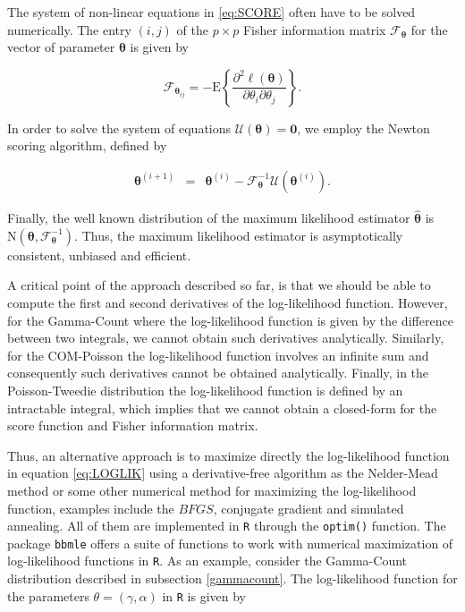 \documentclass[9pt,a5paper,]{book}
\theoremstyle{definition}
\theoremstyle{definition}
\theoremstyle{remark}
\begin{document}
The system of non-linear equations in \eqref{eq:SCORE} often have to be
solved numerically. The entry \((i,j)\) of the \(p \times p\) Fisher
information matrix \(\mathcal{F}_{\boldsymbol{\theta}}\) for the vector
of parameter \(\boldsymbol{\theta}\) is given by

\begin{equation}
\mathcal{F}_{\boldsymbol{\theta}_{ij}} =-\mathrm{E} \left \{ \frac{\partial^2 \ell(\boldsymbol{\theta})}{\partial\theta_i\partial\theta_j} \right \}.
\end{equation}

In order to solve the system of equations
\(\mathcal{U}(\boldsymbol{\theta}) = \boldsymbol{0}\), we employ the
Newton scoring algorithm, defined by

\begin{eqnarray}
\boldsymbol{\theta}^{(i+1)} &=& \boldsymbol{\theta}^{(i)} - \mathcal{F}_{\boldsymbol{\theta}}^{-1} \mathcal{U}(\boldsymbol{\theta}^{(i)}).
\end{eqnarray}

Finally, the well known distribution of the maximum likelihood estimator
\(\boldsymbol{\hat{\theta}}\) is
\(\mathrm{N}(\boldsymbol{\theta}, \mathcal{F}_{\boldsymbol{\theta}}^{-1})\).
Thus, the maximum likelihood estimator is asymptotically consistent,
unbiased and efficient.

A critical point of the approach described so far, is that we should be
able to compute the first and second derivatives of the log-likelihood
function. However, for the Gamma-Count where the log-likelihood function
is given by the difference between two integrals, we cannot obtain such
derivatives analytically. Similarly, for the COM-Poisson the
log-likelihood function involves an infinite sum and consequently such
derivatives cannot be obtained analytically. Finally, in the
Poisson-Tweedie distribution the log-likelihood function is defined by
an intractable integral, which implies that we cannot obtain a
closed-form for the score function and Fisher information matrix.

Thus, an alternative approach is to maximize directly the log-likelihood
function in equation \eqref{eq:LOGLIK} using a derivative-free algorithm
as the Nelder-Mead method \citep{Nelder:1965} or some other numerical
method for maximizing the log-likelihood function, examples include the
\(BFGS\), conjugate gradient and simulated annealing. All of them are
implemented in \texttt{R} through the \texttt{optim()} function. The
package \texttt{bbmle} \citep{bbmle:2014} offers a suite of functions to
work with numerical maximization of log-likelihood functions in
\texttt{R}. As an example, consider the Gamma-Count distribution
described in subsection \ref{gammacount}. The log-likelihood function
for the parameters \(\theta = (\gamma, \alpha)\) in \texttt{R} is given
by
\end{document}
